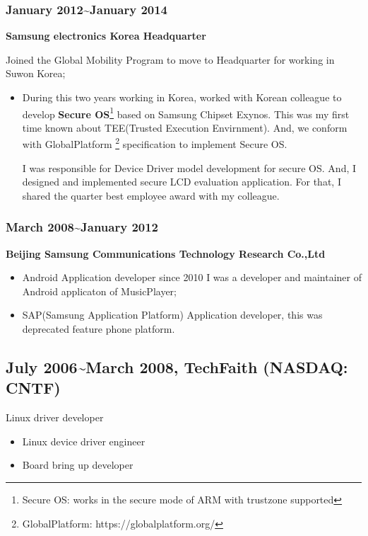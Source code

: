 \documentclass{article}
\begin{document}
\subsubsection{January 2012\~{}January 2014}
\textbf{Samsung electronics Korea Headquarter}

Joined the Global Mobility Program to move to Headquarter for working in Suwon Korea;

\begin{itemize}
\item{}During this two years working in Korea, worked with Korean colleague to develop
\textbf{Secure OS}\footnote{Secure OS: works in the secure mode of ARM with trustzone supported} based on Samsung Chipset Exynos.
This was my first time known about TEE(Trusted Execution Envirnment).
And, we conform with GlobalPlatform {\footnote {GlobalPlatform: https://globalplatform.org/}} specification to implement Secure OS.

I was responsible for Device Driver model development for secure OS. And, I designed and implemented secure LCD evaluation application. For that, I shared the quarter best employee award with my colleague.

\end{itemize}

\subsubsection{March 2008\~{}January 2012}
\textbf{Beijing Samsung Communications Technology Research Co.,Ltd}

\begin{itemize}
\item{Android Application developer} since 2010
I was a developer and maintainer of Android applicaton of MusicPlayer;

\item{SAP(Samsung Application Platform) Application developer}, this was deprecated feature phone platform.
\end{itemize}

\subsection{July 2006\~{}March 2008, TechFaith (NASDAQ: CNTF)}
Linux driver developer
\begin{itemize}
\item{Linux device driver engineer}

\item{Board bring up developer}

\end{itemize}
\end{document}
